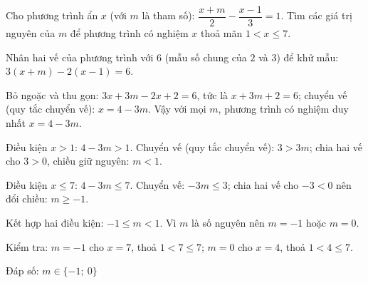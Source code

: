 \begin{problem}[9DS-BPT-009]
Cho phương trình ẩn $x$ (với $m$ là tham số): $\dfrac{x + m}{2} - \dfrac{x - 1}{3} = 1$. Tìm các giá trị nguyên của $m$ để phương trình có nghiệm $x$ thoả mãn $1 < x \leq 7$.

\begin{solution}
Nhân hai vế của phương trình với $6$ (mẫu số chung của $2$ và $3$) để khử mẫu: $3(x + m) - 2(x - 1) = 6$.

Bỏ ngoặc và thu gọn: $3x + 3m - 2x + 2 = 6$, tức là $x + 3m + 2 = 6$; chuyển vế (quy tắc chuyển vế): $x = 4 - 3m$. Vậy với mọi $m$, phương trình có nghiệm duy nhất $x = 4 - 3m$.

Điều kiện $x > 1$: $4 - 3m > 1$. Chuyển vế (quy tắc chuyển vế): $3 > 3m$; chia hai vế cho $3 > 0$, chiều giữ nguyên: $m < 1$.

Điều kiện $x \leq 7$: $4 - 3m \leq 7$. Chuyển vế: $-3m \leq 3$; chia hai vế cho $-3 < 0$ nên đổi chiều: $m \geq -1$.

Kết hợp hai điều kiện: $-1 \leq m < 1$. Vì $m$ là số nguyên nên $m = -1$ hoặc $m = 0$.

Kiểm tra: $m = -1$ cho $x = 7$, thoả $1 < 7 \leq 7$; $m = 0$ cho $x = 4$, thoả $1 < 4 \leq 7$.

Đáp số: $\boxed{m \in \{-1;\ 0\}}$
\end{solution}
\end{problem}

